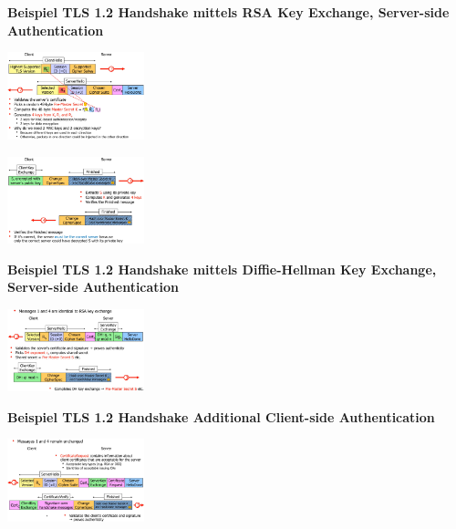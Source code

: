 \documentclass{report}
\newenvironment{Figure}
	{\par\medskip\noindent\minipage{\linewidth}}
	{\endminipage\par\medskip}
\theoremstyle{definition}
\theoremstyle{example}
\begin{document}
\textbf{Beispiel TLS 1.2 Handshake mittels RSA Key Exchange, Server-side Authentication}
\begin{Figure}
\centering
\includegraphics[width=150px]{img/TLSHandshakeRSA.png}
	\label{fig:Abbildung des Ablaufs eines TLS Handshakes mittels RSA Key Exchange (1)}
\end{Figure}

\begin{Figure}
\centering
\includegraphics[width=150px]{img/TLSHandshakeRSAII.png}
	\label{fig:Abbildung des Ablaufs eines TLS Handshakes mittels RSA Key Exchange (2)}
\end{Figure}

\textbf{Beispiel TLS 1.2 Handshake mittels Diffie-Hellman Key Exchange, Server-side Authentication}
\begin{Figure}
\centering
\includegraphics[width=150px]{img/TLSHandshakeDiffieHellman.png}
	\label{fig:Abbildung des Ablaufs eines TLS Handshakes mittels Diffie-Hellman Key Exchange (2)}
\end{Figure}

\textbf{Beispiel TLS 1.2 Handshake Additional Client-side Authentication}
\begin{Figure}
\centering
\includegraphics[width=150px]{img/TLSHandshakeClientSide.png}
	\label{fig:Abbildung des Ablaufs eines TLS Handshakes client-side Authentication}
\end{Figure}
\end{document}
